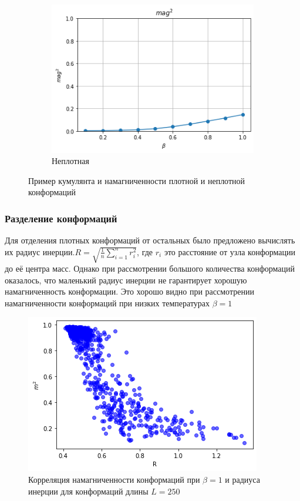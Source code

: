 \begin{figure}[h]
\begin{subfigure}[t]{0.48\textwidth}
		\includegraphics[width=\textwidth]{../images/loose_magnetization.png} 
		\caption{Неплотная}
	\end{subfigure}
	\caption{Пример кумулянта и намагниченности плотной и неплотной конформаций}
\end{figure}


\subsubsection{Разделение конформаций}

Для отделения плотных конформаций от остальных было предложено вычислять их радиус инерции.$R = \sqrt{\frac{1}{n}\sum_{i=1}^{n}r_{i}^{2}}$, где $r_i$ это расстояние от узла конформации до её центра масс. Однако при рассмотрении большого количества конформаций оказалось, что маленький радиус инерции не гарантирует хорошую намагниченность конформации. Это хорошо видно при рассмотрении намагниченности конформаций при низких температурах $\beta = 1$

\begin{figure}[h]
	\centering
	\includegraphics[width=\textwidth]{../images/mag2_to_R_L250.png} 
	\caption{Корреляция намагниченности конформаций при $\beta = 1$ и радиуса инерции для конформаций длины $L = 250$}
	\label{fig:mag2_to_R} 
\end{figure}

